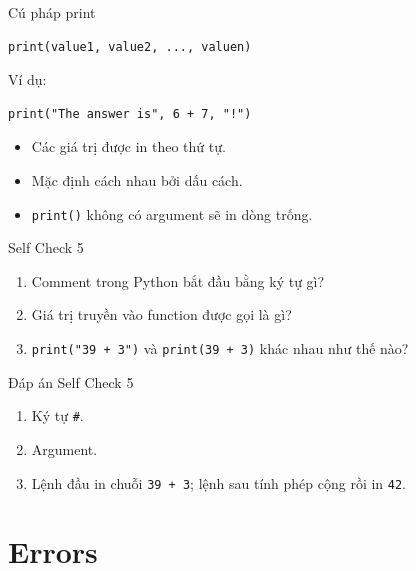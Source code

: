 \documentclass[aspectratio=169,10pt]{beamer}
\begin{document}
\begin{frame}[fragile]{Cú pháp print}
\begin{lstlisting}
print(value1, value2, ..., valuen)
\end{lstlisting}

Ví dụ:

\begin{lstlisting}
print("The answer is", 6 + 7, "!")
\end{lstlisting}

\begin{itemize}
  \item Các giá trị được in theo thứ tự.
  \item Mặc định cách nhau bởi dấu cách.
  \item \texttt{print()} không có argument sẽ in dòng trống.
\end{itemize}
\end{frame}

\begin{frame}{Self Check 5}
\begin{enumerate}
  \item Comment trong Python bắt đầu bằng ký tự gì?
  \item Giá trị truyền vào function được gọi là gì?
  \item \texttt{print("39 + 3")} và \texttt{print(39 + 3)} khác nhau như thế nào?
\end{enumerate}
\end{frame}

\begin{frame}{Đáp án Self Check 5}
\begin{enumerate}
  \item Ký tự \texttt{\#}.
  \item Argument.
  \item Lệnh đầu in chuỗi \texttt{39 + 3}; lệnh sau tính phép cộng rồi in \texttt{42}.
\end{enumerate}
\end{frame}

\section{Errors}
\end{document}
